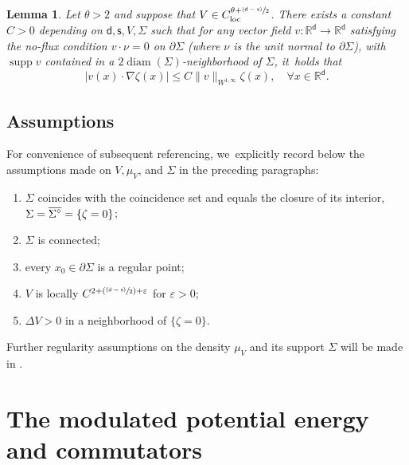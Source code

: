 \documentclass[10pt]{amsart}
\let\epsilon\varepsilon
\newcommand{\Ppsfrac}[2]{(\psfrac{#1}{#2})}
\newcommand{\psfrac}[2]{\sfrac{(#1)}{#2}}
\newcommand{\loc}{\textup{loc}}
\newcommand{\olSigmacirc}{\overline{\Sigma^{\raisebox{1pt}{$\scriptstyle\circ$}}}}
\theoremstyle{plain}
\newtheorem{lemma}[thm]{Lemma}
\theoremstyle{definition}
\DeclareMathOperator{\supp}{supp}
\DeclareMathOperator{\diam}{diam}
\newcommand{\R}{{\mathbb{R}}}
\let\p\partial
\renewcommand{\d}{\mathsf{d}}
\newcommand{\s}{\mathsf{s}}
\begin{document}
\begin{lemma}\label{lem:ugradVext}
Let $\theta>2$ and suppose that $V\in C_{\loc}^{\theta+\psfrac{\d-\s}{2}}$. There exists a constant $C>0$ depending on $\d,\s,V,\Sigma$ such that for any vector field $v:\R^\d\to\R^\d$ {satisfying the no-flux condition $v\cdot \nu =0 $ on $\partial \Sigma$ (where $\nu$ is the unit normal to $\partial \Sigma$)}, with $\supp v$ contained in a $2\diam(\Sigma)$-neighborhood of $\Sigma$, it~holds that
\begin{equation}\label{eq:ugradzeta}
\left|v(x)\cdot\nabla\zeta(x)\right| \leq C\|v\|_{W^{1,\infty}}\zeta(x), \quad \forall x\in\R^\d.
\end{equation}
\end{lemma}

\subsection{Assumptions}\label{ssec:EMOPassmp}
For convenience of subsequent referencing, we~explicitly record below the assumptions made on $V,\mu_V$, and $\Sigma$ in the preceding paragraphs:
\begin{enumerate}\renewcommand{\theenumi}{\textup{H}\arabic{enumi}}
\item\label{assSigeq} $\Sigma$ coincides with the coincidence set and equals the closure of its interior, \ie $\Sigma=\olSigmacirc=\{\zeta=0\}$;
\item\label{assSigcon} $\Sigma$ is connected;
\item\label{assSigrp} every $x_0\in \p\Sigma$ is a regular point;
\item\label{assVreg} $V$ is locally $C^{2+\Ppsfrac{\d-\s}{2}+\epsilon}$ for $\epsilon>0$;
\item\label{assVLapl} $\Delta V>0$ in a neighborhood of $\{\zeta =0\}$.
\end{enumerate}
Further regularity assumptions on the density $\mu_V$ and its support $\Sigma$ will be made in .

\section{The modulated potential energy and commutators}\label{sec:ME}
\end{document}
